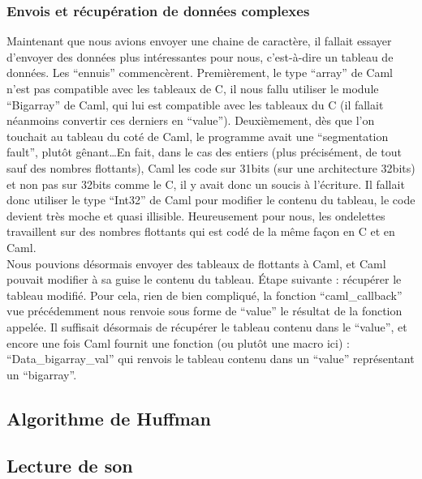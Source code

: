 \documentclass[a4paper,12pt]{article}
\begin{document}
		\subsubsection{Envois et récupération de données complexes}
Maintenant que nous avions envoyer  une chaine de caractère,  il fallait
essayer d'envoyer des données plus intéressantes pour nous, c'est-à-dire
un tableau de  données.  Les ``ennuis'' commencèrent.  Premièrement,  le
type ``array'' de Caml n'est pas  compatible avec les tableaux de C,  il
nous  fallu  utiliser  le  module  ``Bigarray''  de  Caml,  qui  lui est
compatible avec  les tableaux du  C (il fallait  néanmoins convertir ces
derniers en ``value'').  Deuxièmement,  dès que l'on touchait au tableau
du coté de Caml,  le programme avait une ``segmentation fault'',  plutôt
gênant\ldots En fait, dans le cas des entiers (plus précisément, de tout
sauf  des  nombres  flottants),  Caml  les  code  sur  31bits  (sur  une
architecture 32bits) et non pas sur  32bits comme le C,  il y avait donc
un soucis à  l'écriture.  Il fallait donc utiliser le  type ``Int32'' de
Caml pour modifier le contenu du tableau,  le code devient très moche et
quasi illisible.  Heureusement pour nous, les ondelettes travaillent sur
des nombres flottants qui est codé de la même façon en C et en Caml.\\
Nous pouvions  désormais envoyer des  tableaux de flottants  à Caml,  et
Caml pouvait modifier à sa  guise le contenu du tableau.  Étape suivante
: récupérer le tableau modifié.  Pour cela,  rien de bien compliqué,  la
fonction ``caml\_callback'' vue précédemment  nous renvoie sous forme de
``value'' le résultat de la fonction appelée.  Il suffisait désormais de
récupérer le tableau contenu dans le ``value'',  et encore une fois Caml
fournit une fonction (ou plutôt une macro ici) : ``Data\_bigarray\_val''
qui  renvois  le  tableau  contenu  dans  un  ``value''  représentant un
``bigarray''.

	\subsection{Algorithme de Huffman}

	\subsection{Lecture de son}
\end{document}
